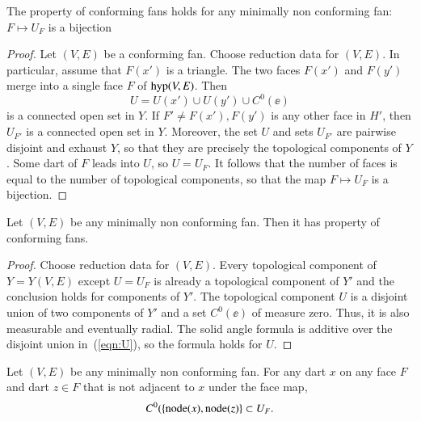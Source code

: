 \begin{lemma}
The property  of conforming fans holds for any
minimally non conforming fan: $F\mapsto U_F$ is a bijection
\end{lemma}

\begin{proof} Let $(V,E)$ be a conforming fan.  Choose reduction data
for $(V,E)$.  In particular, assume that $F(x')$ is a triangle.  The
two faces $F(x')$ and $F(y')$ merge into a single face $F$ of
${\operatorname{hyp}}(V,E)$.  Then
\begin{equation}\label{eqn:U}
U= U(x')\cup U(y')\cup C^0(\ee)
\end{equation} 
is a connected open set in $Y$.  If $F'\ne F(x'),F(y')$ is any other
face in $H'$, then $U_{F'}$ is a connected open set in $Y$.  Moreover,
the set $U$ and sets $U_{F'}$ are pairwise disjoint and exhaust $Y$,
so that they are precisely the topological components of $Y$.  Some
dart of $F$ leads into $U$, so $U=U_F$.  It follows that the number of
faces is equal to the number of topological components, so that the
map $F\mapsto U_F$ is a bijection.
\end{proof}


\begin{lemma} Let $(V,E)$ be any minimally
non conforming fan.  Then it has property  of
conforming fans.
\end{lemma}

\begin{proof} Choose reduction data for $(V,E)$.  Every topological
component of $Y=Y(V,E)$ except $U=U_F$ is already a topological
component of $Y'$ and the conclusion holds for components of $Y'$.
The topological component $U$ is a disjoint union of two components
of $Y'$ and a set $C^0(\ee)$ of measure zero.  Thus, it is also
measurable and eventually radial.  The solid angle formula is
additive over the disjoint union in~(\ref{eqn:U}), so the formula
holds for $U$.
\end{proof}
%


\begin{lemma} Let $(V,E)$ be any minimally
non conforming fan.  For any dart $x$ on any face $F$ and dart $z\in
F$ that is not adjacent to $x$ under the face map,
\begin{displaymath}
C^0(\{{\operatorname{node}}(x),{\operatorname{node}}(z)\} \subset U_F.
\end{displaymath}
\end{lemma}

